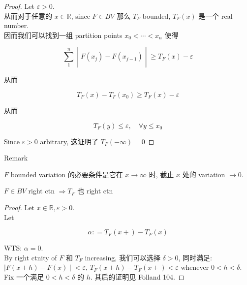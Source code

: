 \begin{proof}

Let \(\varepsilon > 0\).\\
从而对于任意的 \(x \in \mathbb{R}\), since \(F \in BV\) 那么 \(T_{F}\) bounded, \(T_{F}(x)\) 是一个 real number.\\
因而我们可以找到一组 partition points \(x_{0} < \cdots < x_{n}\) 使得

\[\left. \sum\limits_{1}^{n} \middle| F(x_{j}) - F(x_{j - 1}) \middle| \geq T_{F}(x) - \varepsilon \right.\]

从而

\[T_{F}(x) - T_{F}(x_{0}) \geq T_{F}(x) - \varepsilon\]

从而

\[T_{F}(y) \leq \varepsilon,\quad\forall y \leq x_{0}\]

Since \(\varepsilon > 0\) arbitrary, 这证明了 \(T_{F}( - \infty) = 0\)

\end{proof}

\begin{qlremark}{Remark}

\(F\) bounded variation 的必要条件是它在 \(x\rightarrow\infty\) 时, 截止 \(x\) 处的 variation \(\rightarrow 0\).

\end{qlremark}

\begin{lemma}{}

\(F \in BV\) right ctn \(\Longrightarrow T_{F}\) 也 right ctn

\end{lemma}

\begin{proof}

Let \(x \in \mathbb{R},\varepsilon > 0\).\\
Let

\[\alpha: = T_{F}(x + ) - T_{F}(x)\]

WTS: \(\alpha = 0\).\\
By right ctnity of \(F\) 和 \(T_{F}\) increasing, 我们可以选择 \(\delta > 0\), 同时满足: \(\left. |F(x + h) - F(x) \middle| < \varepsilon \right.\), \(T_{F}(x + h) - T_{F}(x + ) < \varepsilon\) whenever \(0 < h < \delta\).\\
Fix 一个满足 \(0 < h < \delta\) 的 \(h\). 其后的证明见 Folland 104.

\end{proof}

